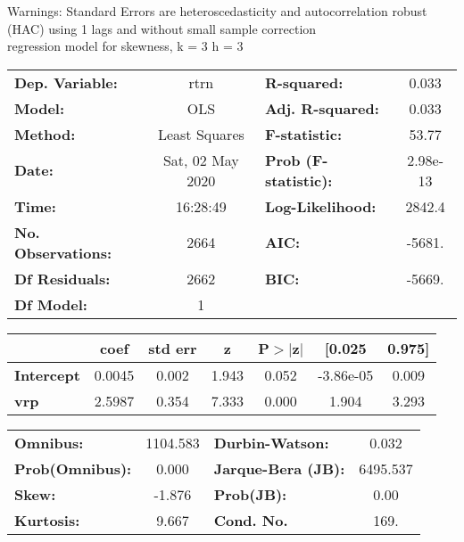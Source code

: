 Warnings: \newline
 [1] Standard Errors are heteroscedasticity and autocorrelation robust (HAC) using 1 lags and without small sample correction\\ 

regression model for skewness, k = 3 h = 3\begin{center}
\begin{tabular}{lclc}
\toprule
\textbf{Dep. Variable:}    &       rtrn       & \textbf{  R-squared:         } &     0.033   \\
\textbf{Model:}            &       OLS        & \textbf{  Adj. R-squared:    } &     0.033   \\
\textbf{Method:}           &  Least Squares   & \textbf{  F-statistic:       } &     53.77   \\
\textbf{Date:}             & Sat, 02 May 2020 & \textbf{  Prob (F-statistic):} &  2.98e-13   \\
\textbf{Time:}             &     16:28:49     & \textbf{  Log-Likelihood:    } &    2842.4   \\
\textbf{No. Observations:} &        2664      & \textbf{  AIC:               } &    -5681.   \\
\textbf{Df Residuals:}     &        2662      & \textbf{  BIC:               } &    -5669.   \\
\textbf{Df Model:}         &           1      & \textbf{                     } &             \\
\bottomrule
\end{tabular}
\begin{tabular}{lcccccc}
                   & \textbf{coef} & \textbf{std err} & \textbf{z} & \textbf{P$> |$z$|$} & \textbf{[0.025} & \textbf{0.975]}  \\
\midrule
\textbf{Intercept} &       0.0045  &        0.002     &     1.943  &         0.052        &    -3.86e-05    &        0.009     \\
\textbf{vrp}       &       2.5987  &        0.354     &     7.333  &         0.000        &        1.904    &        3.293     \\
\bottomrule
\end{tabular}
\begin{tabular}{lclc}
\textbf{Omnibus:}       & 1104.583 & \textbf{  Durbin-Watson:     } &    0.032  \\
\textbf{Prob(Omnibus):} &   0.000  & \textbf{  Jarque-Bera (JB):  } & 6495.537  \\
\textbf{Skew:}          &  -1.876  & \textbf{  Prob(JB):          } &     0.00  \\
\textbf{Kurtosis:}      &   9.667  & \textbf{  Cond. No.          } &     169.  \\
\bottomrule
\end{tabular}
\end{center}

